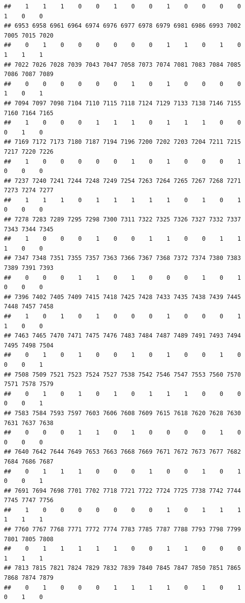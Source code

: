 \documentclass[
]{article}
\begin{document}
\begin{verbatim}
##    1    1    1    0    0    1    0    0    1    0    0    0    0    1    0    0 
## 6953 6958 6961 6964 6974 6976 6977 6978 6979 6981 6986 6993 7002 7005 7015 7020 
##    0    1    0    0    0    0    0    0    1    1    0    1    0    1    1    1 
## 7022 7026 7028 7039 7043 7047 7058 7073 7074 7081 7083 7084 7085 7086 7087 7089 
##    0    0    0    0    0    0    1    0    1    0    0    0    0    1    0    1 
## 7094 7097 7098 7104 7110 7115 7118 7124 7129 7133 7138 7146 7155 7160 7164 7165 
##    1    0    0    0    1    1    1    0    1    1    1    0    0    0    1    0 
## 7169 7172 7173 7180 7187 7194 7196 7200 7202 7203 7204 7211 7215 7217 7220 7226 
##    1    0    0    0    0    0    1    0    1    0    0    0    1    0    0    0 
## 7237 7240 7241 7244 7248 7249 7254 7263 7264 7265 7267 7268 7271 7273 7274 7277 
##    1    1    1    0    1    1    1    1    1    0    1    0    1    0    0    0 
## 7278 7283 7289 7295 7298 7300 7311 7322 7325 7326 7327 7332 7337 7343 7344 7345 
##    1    0    0    0    1    0    0    1    1    0    0    1    1    1    0    0 
## 7347 7348 7351 7355 7357 7363 7366 7367 7368 7372 7374 7380 7383 7389 7391 7393 
##    0    0    0    1    1    0    1    0    0    0    1    0    1    0    0    0 
## 7396 7402 7405 7409 7415 7418 7425 7428 7433 7435 7438 7439 7445 7448 7457 7458 
##    1    0    1    0    1    0    0    0    1    0    0    0    1    1    0    0 
## 7463 7465 7470 7471 7475 7476 7483 7484 7487 7489 7491 7493 7494 7495 7498 7504 
##    0    1    0    1    0    0    1    0    1    0    0    1    0    0    0    1 
## 7508 7509 7521 7523 7524 7527 7538 7542 7546 7547 7553 7560 7570 7571 7578 7579 
##    0    1    0    1    0    1    0    1    1    1    0    0    0    0    0    1 
## 7583 7584 7593 7597 7603 7606 7608 7609 7615 7618 7620 7628 7630 7631 7637 7638 
##    0    0    0    1    1    0    1    0    0    0    0    1    0    0    0    0 
## 7640 7642 7644 7649 7653 7663 7668 7669 7671 7672 7673 7677 7682 7684 7686 7687 
##    0    1    1    1    0    0    0    1    0    0    1    0    1    0    0    1 
## 7691 7694 7698 7701 7702 7718 7721 7722 7724 7725 7738 7742 7744 7745 7747 7756 
##    1    0    0    0    0    0    0    0    1    0    1    1    1    1    1    1 
## 7760 7767 7768 7771 7772 7774 7783 7785 7787 7788 7793 7798 7799 7801 7805 7808 
##    0    1    1    1    1    1    0    0    1    1    0    0    0    1    1    1 
## 7813 7815 7821 7824 7829 7832 7839 7840 7845 7847 7850 7851 7865 7868 7874 7879 
##    0    1    0    0    0    1    1    1    1    0    1    0    1    0    1    0 

\end{verbatim}
\end{document}
